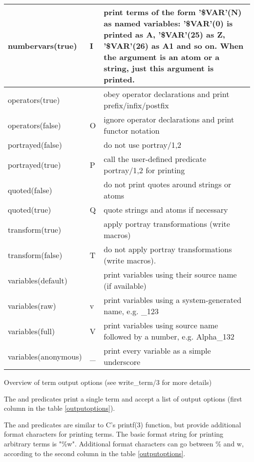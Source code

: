 \begin{center}
\begin{tabular}{|p{3.5cm}|p{1.5cm}|p{10cm}|}
\hline
numbervars(true)	& I & 
print terms of the form '\$VAR'(N) as named variables: 
'\$VAR'(0) is printed as A, '\$VAR'(25) as Z, '\$VAR'(26) as A1 and so on.
When the argument is an atom or a string, just this argument is printed. \\
\hline
operators(true)		&   & obey operator declarations and print prefix/infix/postfix \\
\hline
operators(false)	& O & ignore operator declarations and print functor notation \\
\hline
portrayed(false)	&   & do not use portray/1,2 \\
\hline
portrayed(true)		& P & call the user-defined predicate portray/1,2 for printing \\
\hline
quoted(false)		&   & do not print quotes around strings or atoms \\
\hline
quoted(true)		& Q & quote strings and atoms if necessary \\
\hline
transform(true)		&   & apply portray transformations (write macros) \\
\hline
transform(false)	& T & do not apply portray transformations (write macros). \\
\hline
variables(default)	&   & print variables using their source name (if available) \\
\hline
variables(raw)		& v & print variables using a system-generated name, e.g. _123 \\
\hline
variables(full)		& V & print variables using source name followed by a number, e.g. Alpha_132 \\
\hline
variables(anonymous)	& _ & print every variable as a simple underscore \\
\hline
\end{tabular}

Overview of term output options (see write_term/3 for more details)
\label{outputoptions}
\end{center}
The
 and
predicates print a single {\eclipse} term and accept a list of
output options (first column in the table \ref{outputoptions}).

The
 and
predicates are similar to C's printf(3) function, but provide
additional format characters for printing {\eclipse} terms.
The basic format string for printing arbitrary terms is "\%w".
Additional format characters can go between \% and w, according
to the second column in the table \ref{outputoptions}.

